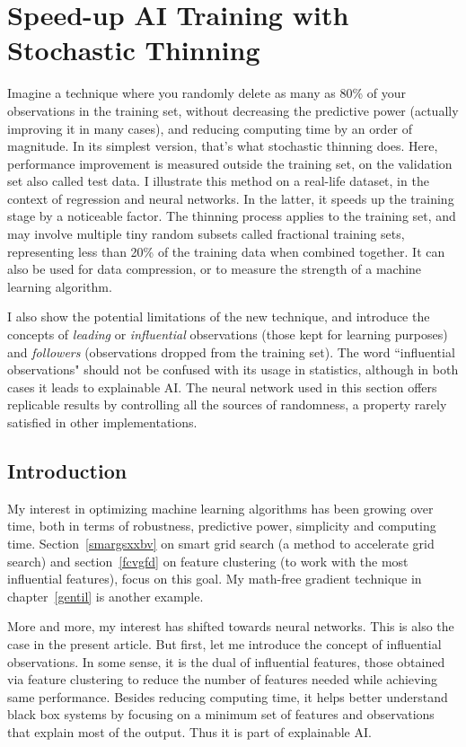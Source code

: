 \documentclass[oneside,10pt]{book}
\begin{document}
\section{Speed-up AI Training with Stochastic Thinning}\label{aithing}

Imagine a technique where you randomly delete as many as 80\% of your
observations in the training set, without decreasing the predictive power (actually improving it in many cases), and reducing
 computing time by an order of magnitude. In its simplest version, that's what stochastic thinning does. Here, performance improvement is measured outside the training set, on the validation set also called test data.
I illustrate this method on a real-life dataset, in the context of regression and neural networks. In the latter,
 it speeds up the training stage by a noticeable factor. The thinning process applies to the training set,  and may involve multiple
 tiny random subsets called fractional training sets, representing less than 20\% of the training data when combined together. It can also be used
 for data compression, or to measure the strength of a machine learning algorithm.


I also show the potential limitations of the new technique, and introduce the concepts of {\em leading} or {\em influential} observations (those kept
 for learning purposes) and {\em followers} (observations dropped from the training set). The word ``influential observations" should not be confused with its usage in statistics, although in both cases it leads to explainable AI.  The neural network used in this section
 offers replicable results by controlling all the sources of randomness, a property rarely satisfied in other implementations.



\subsection{Introduction}\label{derwas}

My interest in optimizing machine learning algorithms has been growing over time, both in terms of robustness, predictive power, simplicity and computing time. Section~\ref{smargsxxbv} on smart grid search (a method to accelerate grid search)
 and section~\ref{fcvgfd} on feature clustering (to work with the most influential features), focus on this goal. My math-free gradient technique in chapter~\ref{gentil} is another example.

More and more, my interest has shifted towards neural networks. This is also the case in the present article. But first, let me introduce the concept of \textcolor{index}{influential observations}. In some sense, it is the dual of
 \textcolor{index}{influential features}, those obtained via
 \textcolor{index}{feature clustering} to reduce the number of features needed while achieving same performance. Besides reducing computing time, it helps better understand black box systems by focusing on a minimum set of features and observations that explain most of the output. Thus it is part of \textcolor{index}{explainable AI}.
\end{document}
